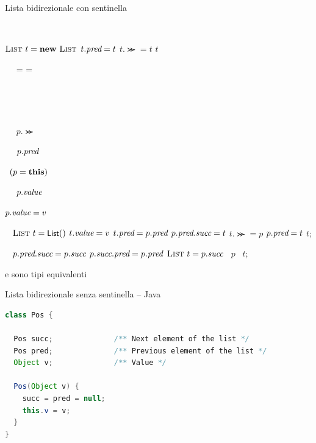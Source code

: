 \begin{frame}[shrink=40]{Lista bidirezionale con sentinella}

\vspace{-12pt}
\begin{Procedure}
\caption[A]{\List}
\begin{multicols}{2}

\List\ \Pred{}
\List\ \Succ{}
\Item\ \Valuevar{}
\BlankLine  

\PROCEDURE{\List\ \listconstructor()}
{
  $\List\ t = \NEW\ \List$\;
  $t.\textit{pred} = t$\;
  $t.\Succ = t$\;
  \Return $t$\;
}
\BlankLine  

\BOOLEAN\ \PROCEDURE{\listempty()}
{
  \Return\ \Pred = \Succ = \THIS\;
}
\BlankLine  

\Postype\ \PROCEDURE{\listhead()}
{
  \Return\ \Succ\;
}
\BlankLine  
  
\Postype\ \PROCEDURE{\listtail()}
{
  \Return\ \Pred\;
}
\BlankLine  
  
\Postype\ 
{
  \Return\ $p.\Succ$\;
}
\BlankLine  

\Postype\ 
{
  \Return\ $p.\textit{pred}$\;
}

\BOOLEAN {}
{
  \Return\ $(p = \THIS)$\;
}
\BlankLine  

\Item\ 
{
  \Return\ $p.\textit{value}$\;
}
\BlankLine  

{
  $p.\textit{value} = v$\;
}
\BlankLine  

\Postype\ 
{
  $\textsc{List}\ t = \textsf{{\small List}}()$\;
  $t.\textit{value} = v$\;
  $t.\textit{pred} = p.\textit{pred}$ 
  \;
  $p.\textit{pred}.\textit{succ} = t$\;
  $t.\Succ = p$
  \;
  $p.\textit{pred} = t$\;
  \Return $t$;
}
\BlankLine  
  
\Postype\ 
{
  $p.\textit{pred}.\textit{succ} = p.\textit{succ}$
  \;
  $p.\textit{succ}.\textit{pred} = p.\textit{pred}$
  \;
  $\textsc{List}\ t = p.\textit{succ}$\;
  \DELETE\ $p$\;
  \Return\ $t$;
}
\end{multicols}
\end{Procedure}
\tiny{\List e \Postype sono tipi equivalenti}
\end{frame}


\begin{frame}[fragile,shrink=3]{Lista bidirezionale senza sentinella -- Java}

\vspace{-12pt}
\begin{lstlisting}[language=java]
class Pos {

  Pos succ;              /** Next element of the list */
  Pos pred;              /** Previous element of the list */
  Object v;              /** Value */

  Pos(Object v) {
    succ = pred = null;
    this.v = v;
  }
}
\end{lstlisting}
\end{frame}


